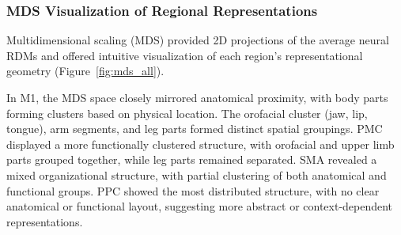 \documentclass{article}
\begin{document}

\subsubsection{MDS Visualization of Regional Representations}

Multidimensional scaling (MDS) provided 2D projections of the average neural RDMs and offered intuitive visualization of each region’s representational geometry (Figure~\ref{fig:mds_all}).

In M1, the MDS space closely mirrored anatomical proximity, with body parts forming clusters based on physical location. The orofacial cluster (jaw, lip, tongue), arm segments, and leg parts formed distinct spatial groupings. PMC displayed a more functionally clustered structure, with orofacial and upper limb parts grouped together, while leg parts remained separated. SMA revealed a mixed organizational structure, with partial clustering of both anatomical and functional groups. PPC showed the most distributed structure, with no clear anatomical or functional layout, suggesting more abstract or context-dependent representations.
\end{document}

